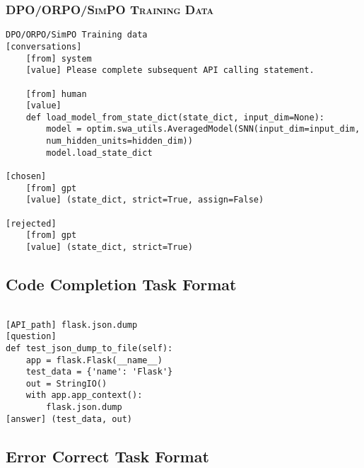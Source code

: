 \subsubsection{\textsc{DPO/ORPO/SimPO Training Data}}
\begin{tcolorbox}[colback=gray!5!white, width=\linewidth, left=1mm, right=-3mm, top=1mm, bottom=1mm]
\begin{Verbatim}[fontsize=\normalsize]
DPO/ORPO/SimPO Training data
[conversations] 
    [from] system
    [value] Please complete subsequent API calling statement.

    [from] human
    [value]
    def load_model_from_state_dict(state_dict, input_dim=None):
        model = optim.swa_utils.AveragedModel(SNN(input_dim=input_dim,
        num_hidden_units=hidden_dim))
        model.load_state_dict
        
[chosen]
    [from] gpt
    [value] (state_dict, strict=True, assign=False)
 
[rejected] 
    [from] gpt
    [value] (state_dict, strict=True)
\end{Verbatim}
\end{tcolorbox}



\subsection{Code Completion Task Format}

\begin{tcolorbox}[colback=gray!5!white, width=\linewidth, left=1mm, right=-3mm, top=1mm, bottom=1mm]
\begin{Verbatim}[fontsize=\normalsize]

[API_path] flask.json.dump
[question]
def test_json_dump_to_file(self):
    app = flask.Flask(__name__)
    test_data = {'name': 'Flask'}
    out = StringIO()
    with app.app_context():
        flask.json.dump
[answer] (test_data, out)

\end{Verbatim}
\end{tcolorbox}

\subsection{Error Correct Task Format}

